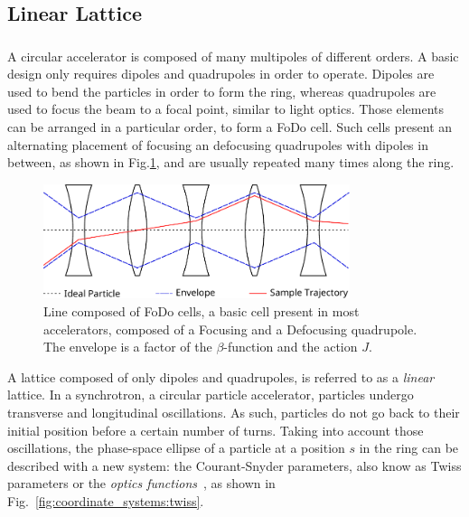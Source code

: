\subsection{Linear Lattice}


\subsubsection{}
\label{section:courant_snyder}

A circular accelerator is composed of many multipoles of different orders. A basic
design only requires dipoles and quadrupoles in order to operate. Dipoles are used to bend the
particles in order to form the ring, whereas quadrupoles are used to focus the beam to a focal
point, similar to light optics.
Those elements can be arranged in a particular order, to form a FoDo cell. Such cells present an
alternating placement of focusing an defocusing quadrupoles with dipoles in between, as shown in
Fig.\ref{fig:coordinate_systems:fodo}, and are usually repeated many times along the ring.

\begin{figure}[htb]
    \centering
    \includegraphics[width=0.8\textwidth]{images/fodo_drawing.pdf}
    \caption{Line composed of FoDo cells, a basic cell present in most accelerators, composed of a
    Focusing and a Defocusing quadrupole. The envelope is a factor of the $\beta$-function and the
    action $J$.}
    \label{fig:coordinate_systems:fodo}
\end{figure}

A lattice composed of only dipoles and quadrupoles, is referred to as a \textit{linear} lattice.
In a synchrotron, a circular particle accelerator, particles undergo transverse and longitudinal 
oscillations. As such, particles do not go back to their initial position before a certain number
of turns. Taking into account those oscillations, the phase-space ellipse of a particle at a 
position $s$ in the ring can be described with a new system: the Courant-Snyder parameters, also
know as Twiss parameters or the \textit{optics functions}~\cite{courant_theory_1958}, as shown in
Fig.~\ref{fig:coordinate_systems:twiss}.\\

